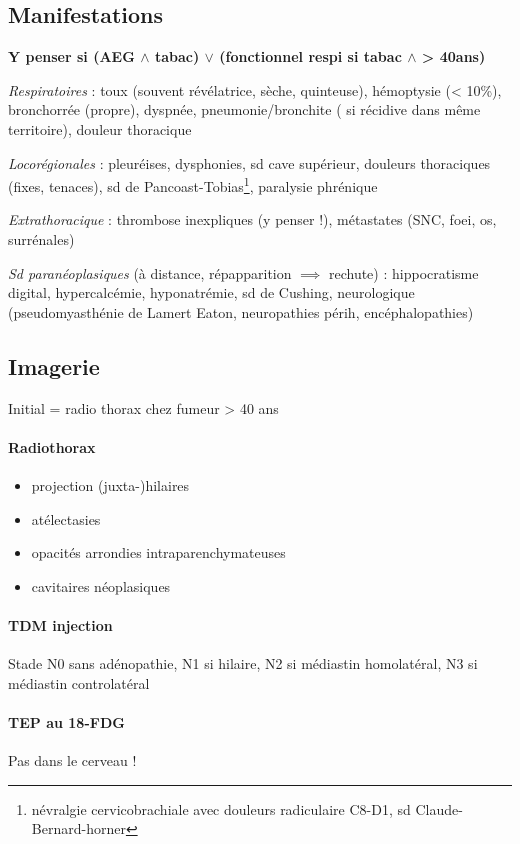 \subsection{Manifestations}
\textbf{Y penser si (AEG $\wedge$ tabac) $\vee$ (fonctionnel respi si tabac $\wedge$ >
40ans)}

\textit{Respiratoires}  : toux (souvent révélatrice, sèche, quinteuse), hémoptysie (<
10\%), bronchorrée (propre), dyspnée, pneumonie/bronchite (\danger{} si récidive
dans même territoire), douleur thoracique 

\textit{Locorégionales}  : pleuréises, dysphonies, sd cave supérieur, douleurs thoraciques
(fixes, tenaces), sd de Pancoast-Tobias\footnote{névralgie cervicobrachiale avec
douleurs radiculaire C8-D1, sd Claude-Bernard-horner}, paralysie phrénique

\textit{Extrathoracique}  : thrombose inexpliques (y penser !), métastates (SNC,
foei, os, surrénales)

\textit{Sd paranéoplasiques} (à distance, répapparition $\implies$ rechute) :
hippocratisme digital, hypercalcémie, hyponatrémie, sd de Cushing, neurologique
(pseudomyasthénie de Lamert Eaton, neuropathies périh, encéphalopathies)

\subsection{Imagerie}
Initial = radio thorax chez fumeur > 40 ans
\paragraph{Radiothorax}
\begin{itemize}
  \item projection (juxta-)hilaires
  \item atélectasies
  \item opacités arrondies intraparenchymateuses
  \item cavitaires néoplasiques
\end{itemize}

\paragraph{TDM injection}
Stade N0 sans adénopathie, N1 si hilaire, N2 si médiastin homolatéral, N3 si médiastin
controlatéral

\paragraph{TEP au 18-FDG}
Pas dans le cerveau !

